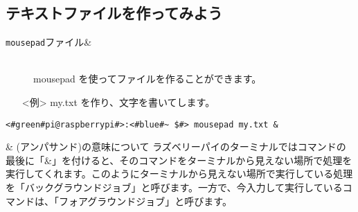 \newpage
\subsection{テキストファイルを作ってみよう}
\begin{description}
\item[\texttt{mousepad}\textvisiblespace ファイル\textvisiblespace \&]\mbox{}\\
mousepad を使ってファイルを作ることができます。
\end{description}
\begin{itemize}
\item[<例>]my.txt を作り、文字を書いてします。
\end{itemize}
\begin{lstlisting}[caption=mousepadの例, label=mousepad]
<#green#pi@raspberrypi#>:<#blue#~ $#> mousepad my.txt &
\end{lstlisting}

\begin{itembox}[c]{\& (アンパサンド)の意味について}
    ラズベリーパイのターミナルではコマンドの最後に「\&」を付けると、そのコマンドをターミナルから見えない場所で処理を実行してくれます。このようにターミナルから見えない場所で実行している処理を「バックグラウンドジョブ」と呼びます。一方で、今入力して実行しているコマンドは、「フォアグラウンドジョブ」と呼びます。
\end{itembox}

\begin{tcolorbox}[title=\useOmetoi]
\begin{enumerate}
\end{enumerate}
\end{tcolorbox}
